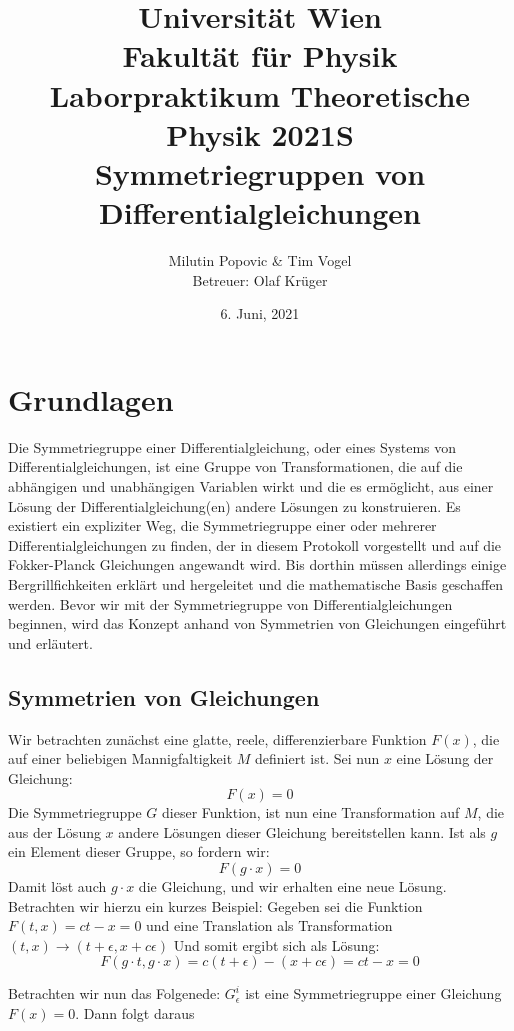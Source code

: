 \documentclass[a4paper]{article}
\title{Universität Wien\\ Fakultät für Physik\\ \vspace{1.25cm}Laborpraktikum
Theoretische Physik 2021S \\ Symmetriegruppen von Differentialgleichungen }
\author{Milutin Popovic \& Tim Vogel \vspace{1cm}\\ Betreuer: Olaf Krüger}
\date{6. Juni, 2021}
\begin{document}
\maketitle
\tableofcontents
\section{Grundlagen} Die Symmetriegruppe einer
Differentialgleichung, oder eines Systems von Differentialgleichungen, ist
eine Gruppe von Transformationen, die auf die abhängigen und unabhängigen
Variablen wirkt und die es ermöglicht, aus einer Lösung der
Differentialgleichung(en) andere Lösungen zu konstruieren. Es existiert ein
expliziter Weg, die Symmetriegruppe einer oder mehrerer
Differentialgleichungen zu finden, der in diesem Protokoll vorgestellt und
auf die Fokker-Planck Gleichungen angewandt wird. Bis dorthin müssen
allerdings einige Bergrillfichkeiten erklärt und hergeleitet und die
mathematische Basis geschaffen werden. Bevor wir mit der Symmetriegruppe von
Differentialgleichungen beginnen, wird das Konzept anhand von Symmetrien von
Gleichungen eingeführt und erläutert.  \subsection{Symmetrien von
Gleichungen} Wir betrachten zunächst eine glatte, reele, differenzierbare
Funktion $F(x)$, die auf einer beliebigen Mannigfaltigkeit $M$ definiert ist.
Sei nun $x$ eine Lösung der Gleichung:
\begin{equation} F(x)=0
\end{equation}
Die Symmetriegruppe $G$ dieser Funktion, ist nun eine Transformation auf
$M$, die aus der Lösung $x$ andere Lösungen dieser Gleichung
bereitstellen kann. Ist als $g$ ein Element dieser Gruppe, so fordern
wir:
\begin{equation} F(g\cdot x)=0
\end{equation}
    Damit löst auch
$g\cdot x$ die Gleichung, und wir erhalten eine neue Lösung.
Betrachten wir hierzu ein kurzes Beispiel: Gegeben sei die Funktion
$F(t,x)=ct-x=0$ und eine Translation als Transformation
$(t,x)\rightarrow (t+\epsilon,x+c\epsilon)$ Und somit ergibt sich als
Lösung:
\begin{equation} F(g\cdot t,g\cdot
x)=c(t+\epsilon)-(x+c\epsilon)=ct-x=0
\end{equation} \newline

Betrachten wir nun das Folgenede: $G^i_\epsilon$ ist eine
Symmetriegruppe einer Gleichung $F(x)=0$. Dann folgt daraus
\end{document}
